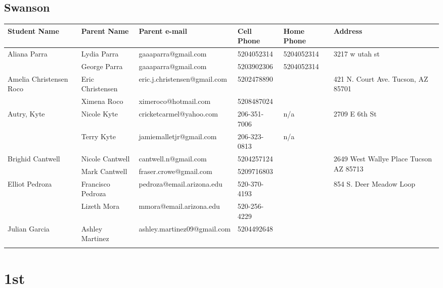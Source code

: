 \documentclass[landscape]{article}\usepackage[]{graphicx}\usepackage[]{color}
\begin{document}
\subsection{Swanson}
\begin{longtable}{|p{100pt}|p{100pt}|p{140pt}|p{60pt}|p{64pt}|p{120pt}|}
\textbf{Student Name} & \textbf{Parent Name} & \textbf{Parent e-mail} & \textbf{Cell Phone} & \textbf{Home Phone} & \textbf{Address}\\
\hline
\hline
\multirow{2}{100pt}{Aliana Parra} & Lydia Parra & gaaaparra@gmail.com & 5204052314 & 5204052314 & \multirow{2}{120pt}{3217 w utah st} \\
 & George Parra & gaaaparra@gmail.com & 5203902306 & 5204052314 & \\
\hline
\multirow{2}{100pt}{Amelia Christensen Roco} & Eric Christensen & eric.j.christensen@gmail.com & 5202478890 &  & \multirow{2}{120pt}{421 N. Court Ave. Tucson, AZ 85701} \\
 & Ximena Roco & ximeroco@hotmail.com & 5208487024 &  & \\
\hline
\multirow{2}{100pt}{Autry, Kyte} & Nicole Kyte & cricketcarmel@yahoo.com & 206-351-7006 & n/a & \multirow{2}{120pt}{2709 E 6th St} \\
 & Terry Kyte & jamiemalletjr@gmail.com & 206-323-0813 & n/a & \\
\hline
\multirow{2}{100pt}{Brighid Cantwell} & Nicole Cantwell & cantwell.n@gmail.com & 5204257124 &  & \multirow{2}{120pt}{2649 West Wallye Place Tucson AZ 85713} \\
 & Mark Cantwell & fraser.crowe@gmail.com & 5209716803 &  & \\
\hline
\multirow{2}{100pt}{Elliot Pedroza} & Francisco Pedroza & pedroza@email.arizona.edu & 520-370-4193 &  & \multirow{2}{120pt}{854 S. Deer Meadow Loop} \\
 & Lizeth Mora & mmora@email.arizona.edu & 520-256-4229 &  & \\
\hline
\multirow{2}{100pt}{Julian Garcia} & Ashley Martinez & ashley.martinez09@gmail.com & 5204492648 &  & \multirow{2}{120pt}{} \\
 &  &  &  &  & \\
\hline
\end{longtable}
\newpage
\section{1st}
\end{document}
